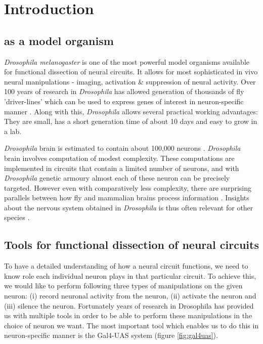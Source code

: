 \chapter{Introduction}
\label{chp:Introduction}


\section{\protect{} as a model organism}
\textit{Drosophila melanogaster} is one of the most powerful model organisms available for functional dissection of neural circuits. It allows for most sophisticated in vivo neural manipulations - imaging, activation \& suppression of neural activity. Over 100 years of research in \textit{Drosophila} has allowed generation of thousands of fly 'driver-lines' which can be used to express genes of interest in neuron-specific manner \parencite{Pfeiffer2008}. Along with this, \textit{Drosophila} allows several practical working advantages: They are small, has a short generation time of about 10 days and easy to grow in a lab. 

\textit{Drosophila} brain is estimated to contain about 100,000 neurons \parencite{Zheng2018}. \textit{Drosophila} brain involves computation of modest complexity. These computations are implemented in circuits that contain a limited number of neurons, and with \textit{Drosophila} genetic armoury almost each of these neuron can be precisely targeted. However even with comparatively less complexity, there are surprising parallels between how fly and mammalian brains process information \parencite{Borst2015}. Insights about the nervous system obtained in \textit{Drosophila} is thus often relevant for other species \parencite{Bellen2010, Venken2011}.

\section{Tools for functional dissection of \protect{} neural circuits}
To have a detailed understanding of how a neural circuit functions, we need to know role each individual neuron plays in that particular circuit. To achieve this, we would like to perform following three types of manipulations on the given neuron: (i) record neuronal activity from the neuron, (ii) activate the neuron and (iii) silence the neuron. Fortunately years of research in Drosophila has provided us with multiple tools in order to be able to perform these manipulations in the choice of neuron we want. The most important tool which enables us to do this in neuron-specific manner is the Gal4-UAS system (figure  \ref{fig:gal4uas}). 


